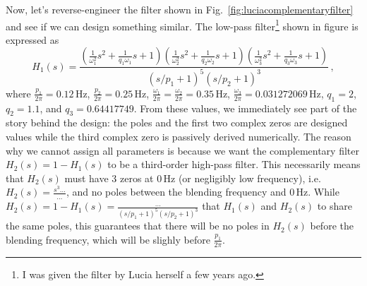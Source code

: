 Now, let's reverse-engineer the filter shown in Fig.~\ref{fig:luciacomplementaryfilter} and see if we can design something similar.
The low-pass filter\footnote{I was given the filter by Lucia herself a few years ago.} shown in figure is expressed as
\begin{equation}
	H_1(s) = \frac{\left(\frac{1}{\omega_1^2}s^2+\frac{1}{q_1\omega_1}s+1\right)\left(\frac{1}{\omega_2^2}s^2+\frac{1}{q_2\omega_2}s+1\right)\left(\frac{1}{\omega_3^2}s^2+\frac{1}{q_3\omega_3}s+1\right)}{(s/p_1+1)^5(s/p_2+1)^3}\,,
	\label{eqn:complementary_low-pass_filter_lucia}
\end{equation}
where $\frac{p_1}{2\pi} = 0.12\,\mathrm{Hz}$, $\frac{p_2}{2\pi} = 0.25\,\mathrm{Hz}$, $\frac{\omega_1}{2\pi}=\frac{\omega_2}{2\pi} = 0.35\,\mathrm{Hz}$, $\frac{\omega_3}{2\pi} = 0.031272069\,\mathrm{Hz}$, $q_1 = 2$, $q_2 = 1.1$, and $q_3 = 0.64417749$.
From these values, we immediately see part of the story behind the design: the poles and the first two complex zeros are designed values while the third complex zero is passively derived numerically.
The reason why we cannot assign all parameters is because we want the complementary filter
$H_2(s)=1-H_1(s)$ to be a third-order high-pass filter.
This necessarily means that $H_2(s)$ must have 3 zeros at $0\,\mathrm{Hz}$ (or negligibly low frequency), i.e. $H_2(s) = \frac{s^3\dots}{\dots}$, and no poles between the blending frequency and $0\,\mathrm{Hz}$.
While $H_2(s) = 1-H_1(s) = \frac{\dots}{\left(s/p_1+1\right)^5\left(s/p_2+1\right)^3}$ that $H_1(s)$ and $H_2(s)$ to share the same poles, this guarantees that there will be no poles in $H_2(s)$ before the blending frequency, which will be slighly before $\frac{p_1}{2\pi}$.

